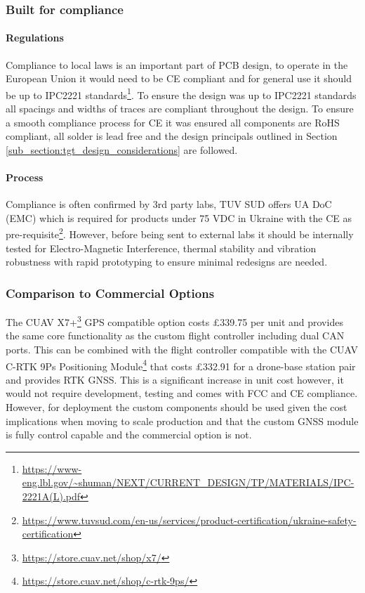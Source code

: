 \subsubsection{Built for compliance}
\paragraph{Regulations}
Compliance to local laws is an important part of \gls{PCB} design, to operate in the European Union it would need to be CE compliant and for general use it should be up to IPC2221 standards\footnote{\url{https://www-eng.lbl.gov/~shuman/NEXT/CURRENT_DESIGN/TP/MATERIALS/IPC-2221A(L).pdf}}. To ensure the design was up to IPC2221 standards all spacings and widths of traces are compliant throughout the design. To ensure a smooth compliance process for CE it was ensured all components are \gls{RoHS} compliant, all solder is lead free and the design principals outlined in Section \ref{sub_section:tgt_design_considerations} are followed.
\paragraph{Process}
Compliance is often confirmed by 3rd party labs, TUV SUD offers UA DoC (EMC) which is required for products under 75 VDC in Ukraine with the CE as pre-requisite\footnote{\url{https://www.tuvsud.com/en-us/services/product-certification/ukraine-safety-certification}}. However, before being sent to external labs it should be internally tested for Electro-Magnetic Interference, thermal stability and vibration robustness with rapid prototyping to ensure minimal redesigns are needed.  

\subsubsection{Comparison to Commercial Options}\label{sub_sub_section:tgt_commercial_options}

The CUAV X7+\footnote{\url{https://store.cuav.net/shop/x7/}} GPS compatible option costs £339.75 per unit and provides the same core functionality as the custom flight controller including dual \gls{CAN} ports. This can be combined with the flight controller compatible with the CUAV C-RTK 9Ps Positioning Module\footnote{\url{https://store.cuav.net/shop/c-rtk-9ps/}} that costs £332.91 for a drone-base station pair and provides \gls{RTK} \gls{GNSS}. This is a significant increase in unit cost however, it would not require development, testing and comes with FCC and CE compliance. However, for deployment the custom components should be used given the cost implications when moving to scale production and that the custom \gls{GNSS} module is fully control capable and the commercial option is not. 
